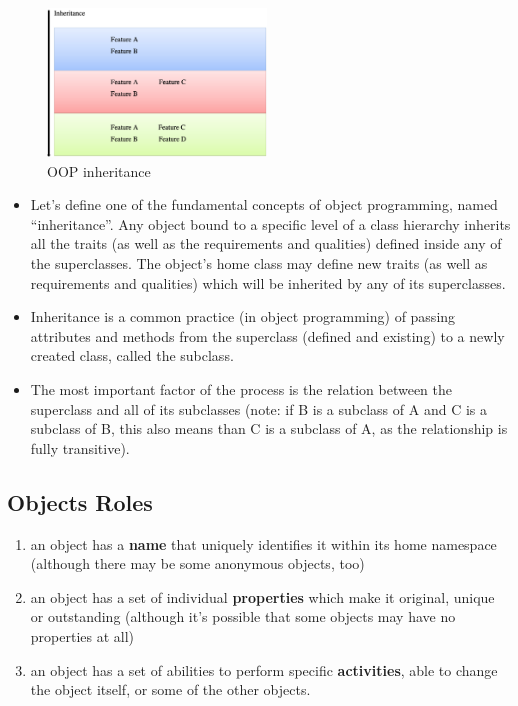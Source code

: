 \documentclass[11pt]{article}
\begin{document}
\begin{figure}[htbp]
\centering
\includegraphics[width=220px]{./images/OopInheritance.png}
\caption{OOP inheritance}
\end{figure}

\begin{itemize}
\item Let’s define one of the fundamental concepts of object programming,
named “inheritance”. Any object bound to a specific level of a class
hierarchy inherits all the traits (as well as the requirements and
qualities) defined inside any of the superclasses. The object’s home
class may define new traits (as well as requirements and qualities)
which will be inherited by any of its superclasses.

\item Inheritance is a common practice (in object programming) of passing
attributes and methods from the superclass (defined and existing) to
a newly created class, called the subclass.

\item The most important factor of the process is the relation between the
superclass and all of its subclasses (note: if B is a subclass of A
and C is a subclass of B, this also means than C is a subclass of A,
as the relationship is fully transitive).
\end{itemize}

\subsection{Objects Roles}
\label{sec:org409e2f8}
\begin{enumerate}
\item an object has a \textbf{name} that uniquely identifies it within its home
namespace (although there may be some anonymous objects, too)
\item an object has a set of individual \textbf{properties} which make it
original, unique or outstanding (although it’s possible that some
objects may have no properties at all)
\item an object has a set of abilities to perform specific \textbf{activities},
able to change the object itself, or some of the other objects.
\end{enumerate}
\end{document}
